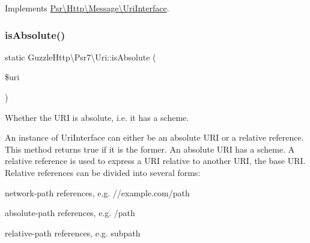 Implements \hyperlink{interfacePsr_1_1Http_1_1Message_1_1UriInterface_aa19d2f6ab55d87aa607bfca6995f9923}{Psr\textbackslash{}\+Http\textbackslash{}\+Message\textbackslash{}\+Uri\+Interface}.

\mbox{\label{classGuzzleHttp_1_1Psr7_1_1Uri_ae863982e053522ed756733d2354eb575}} 
\subsubsection{\texorpdfstring{is\+Absolute()}{isAbsolute()}}
{\footnotesize\ttfamily static Guzzle\+Http\textbackslash{}\+Psr7\textbackslash{}\+Uri\+::is\+Absolute (\begin{DoxyParamCaption}\item[{\hyperlink{interfacePsr_1_1Http_1_1Message_1_1UriInterface}{Uri\+Interface}}]{\$uri }\end{DoxyParamCaption})\hspace{0.3cm}{\ttfamily [static]}}

Whether the U\+RI is absolute, i.\+e. it has a scheme.

An instance of Uri\+Interface can either be an absolute U\+RI or a relative reference. This method returns true if it is the former. An absolute U\+RI has a scheme. A relative reference is used to express a U\+RI relative to another U\+RI, the base U\+RI. Relative references can be divided into several forms\+:
\begin{DoxyItemize}
\item network-\/path references, e.\+g. \textquotesingle{}//example.com/path\textquotesingle{}
\item absolute-\/path references, e.\+g. \textquotesingle{}/path\textquotesingle{}
\item relative-\/path references, e.\+g. \textquotesingle{}subpath\textquotesingle{}
\end{DoxyItemize}


